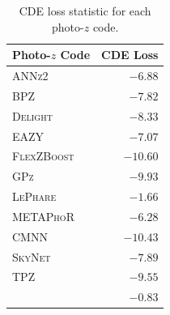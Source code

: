 \begin{table}  %
\centering
\caption{CDE loss statistic for each photo-$z$ code.} \label{tab:cdeloss}
\begin{tabular}{lr}
\hline
\bf Photo-$z$ Code & \bf CDE Loss \\
\hline
\textsc{ANNz2} 		& $-6.88$ \\
\textsc{BPZ} 		& $-7.82$ \\
\textsc{Delight}    & $-8.33$\\
\textsc{EAZY}       & $-7.07$ \\
\textsc{FlexZBoost} & $-10.60$\\
\textsc{GPz} 		& $-9.93$ \\
\textsc{LePhare} 	& $-1.66$ \\
\textsc{METAPhoR} 	& $-6.28$ \\
\textsc{CMNN}         & $-10.43$ \\
\textsc{SkyNet} 	& $-7.89$ \\
\textsc{TPZ} 		& $-9.55$ \\
\hline
\trainz		& $-0.83$ \\
\end{tabular}
\end{table}

